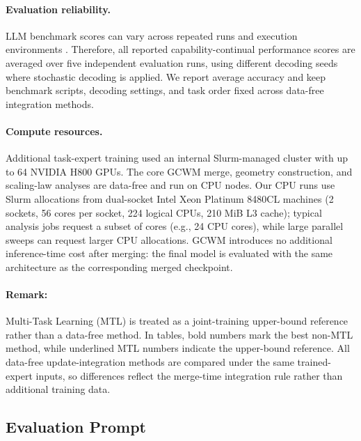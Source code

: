\documentclass{article}
\begin{document}
\paragraph{Evaluation reliability.}
LLM benchmark scores can vary across repeated runs and execution environments \cite{yang2026inficoevalchain}.
Therefore, all reported capability-continual performance scores are averaged over five independent evaluation runs, using different decoding seeds where stochastic decoding is applied.
We report average accuracy and keep benchmark scripts, decoding settings, and task order fixed across data-free integration methods.

\paragraph{Compute resources.}
Additional task-expert training used an internal Slurm-managed cluster with up to 64 NVIDIA H800 GPUs.
The core GCWM merge, geometry construction, and scaling-law analyses are data-free and run on CPU nodes.
Our CPU runs use Slurm allocations from dual-socket Intel Xeon Platinum 8480CL machines (2 sockets, 56 cores per socket, 224 logical CPUs, 210 MiB L3 cache); typical analysis jobs request a subset of cores (e.g., 24 CPU cores), while large parallel sweeps can request larger CPU allocations.
GCWM introduces no additional inference-time cost after merging: the final model is evaluated with the same architecture as the corresponding merged checkpoint.

\paragraph{Remark:}
Multi-Task Learning (MTL) is treated as a joint-training upper-bound reference rather than a data-free method.
In tables, bold numbers mark the best non-MTL method, while underlined MTL numbers indicate the upper-bound reference.
All data-free update-integration methods are compared under the same trained-expert inputs, so differences reflect the merge-time integration rule rather than additional training data.


\subsection{Evaluation Prompt}
\label{app:evaluation_prompt}
\end{document}
